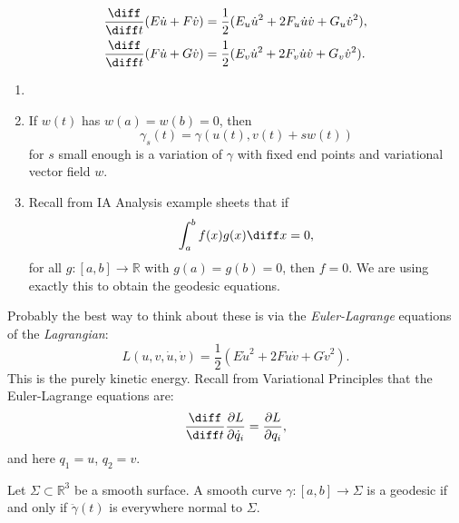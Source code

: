 \documentclass[12pt]{article}
\begin{document}
\begin{align*}
	\frac{\diff}{\diff t} (E\dot u + F \dot v) &= \frac{1}{2} (E_u \dot u^2 + 2 F_u \dot u \dot v + G_u \dot v^2), \\
	\frac{\diff}{\diff t}(F \dot u + G \dot v) &= \frac{1}{2} (E_v \dot u^2 + 2 F_v \dot u \dot v + G_v \dot v^2).
\end{align*}
\begin{remark}
	\begin{enumerate}
		\item[]
		\item If $w(t)$ has $w(a) = w(b) = 0$, then
			\[
			\gamma_s(t) = \gamma(u(t), v(t) + s w(t))
			\]
			for $s$ small enough is a variation of $\gamma$ with fixed end points and variational vector field $w$.
		\item Recall from IA Analysis example sheets that if
			\[
			\int_{a}^{b} f(x) g(x) \diff x = 0,
			\]
			for all $g : [a, b] \to \mathbb{R}$ with $g(a) = g(b) = 0$, then $f = 0$. We are using exactly this to obtain the geodesic equations.
	\end{enumerate}
\end{remark}


Probably the best way to think about these is via the \emph{Euler-Lagrange} equations of the \emph{Lagrangian}:
\[
L(u, v, \dot u, \dot v) = \frac{1}{2}(E \dot u^2 + 2 F \dot u \dot v + G \dot v^2).
\]
This is the purely kinetic energy. Recall from Variational Principles that the Euler-Lagrange equations are:
\[
\frac{\diff}{\diff t} \frac{\partial L}{\partial \dot q_i} = \frac{\partial L}{\partial q_i},
\]
and here $q_1 = u$, $q_2 = v$.

\begin{proposition}
	Let $\Sigma \subset \mathbb{R}^3$ be a smooth surface. A smooth curve $\gamma: [a, b] \to \Sigma$ is a geodesic if and only if $\ddot \gamma(t)$ is everywhere normal to $\Sigma$.
\end{proposition}
\end{document}
